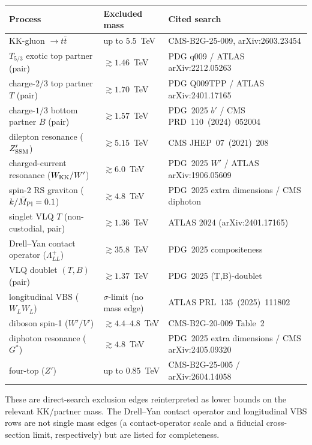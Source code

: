 \documentclass[11pt]{article}
\begin{document}
\smallskip
\begin{center}
\small
\renewcommand{\arraystretch}{1.15}
\begin{tabular}{
  >{\raggedright\arraybackslash}p{}
  >{\raggedright\arraybackslash}p{}
  >{\raggedright\arraybackslash}p{}}
\toprule
Process & Excluded mass & Cited search \\
\midrule
KK-gluon $\to t\bar t$            & up to $5.5$~TeV  & CMS-B2G-25-009, arXiv:2603.23454 \\
$T_{5/3}$ exotic top partner (pair) & $\gtrsim1.46$~TeV & PDG q009 / ATLAS arXiv:2212.05263 \\
charge-$2/3$ top partner $T$ (pair) & $\gtrsim1.70$~TeV & PDG Q009TPP / ATLAS arXiv:2401.17165 \\
charge-$1/3$ bottom partner $B$ (pair) & $\gtrsim1.57$~TeV & PDG~2025 $b'$ / CMS PRD~110~(2024)~052004 \\
dilepton resonance ($Z'_{\rm SSM}$) & $\gtrsim5.15$~TeV & CMS JHEP~07~(2021)~208 \\
charged-current resonance ($W_{\rm KK}/W'$) & $\gtrsim6.0$~TeV & PDG~2025 $W'$ / ATLAS arXiv:1906.05609 \\
spin-2 RS graviton ($k/\bar M_{\rm Pl}=0.1$) & $\gtrsim4.8$~TeV & PDG~2025 extra dimensions / CMS diphoton \\
singlet VLQ $T$ (non-custodial, pair) & $\gtrsim1.36$~TeV & ATLAS 2024 (arXiv:2401.17165) \\
Drell--Yan contact operator ($\Lambda_{LL}^+$) & $\gtrsim35.8$~TeV & PDG~2025 compositeness \\
VLQ doublet $(T,B)$ (pair)       & $\gtrsim1.37$~TeV & PDG~2025 (T,B)-doublet \\
longitudinal VBS ($W_LW_L$)      & $\sigma$-limit (no mass edge) & ATLAS PRL~135~(2025)~111802 \\
diboson spin-1 ($W'/V'$)         & $\gtrsim4.4$--$4.8$~TeV & CMS-B2G-20-009 Table~2 \\
diphoton resonance ($G^*$)       & $\gtrsim4.8$~TeV & PDG~2025 extra dimensions / CMS arXiv:2405.09320 \\
four-top ($Z'$)                  & up to $0.85$~TeV & CMS-B2G-25-005 / arXiv:2604.14058 \\
\bottomrule
\end{tabular}
\end{center}

\smallskip
\noindent These are direct-search exclusion edges reinterpreted as lower bounds on
the relevant KK/partner mass. The Drell--Yan contact operator and longitudinal VBS
rows are not single mass edges (a contact-operator scale and a fiducial
cross-section limit, respectively) but are listed for completeness.
\end{document}
